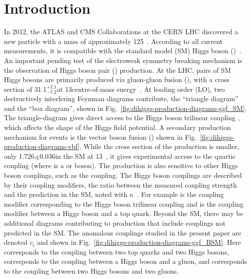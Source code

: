 
\maketitle
\section{Introduction}
In 2012, the ATLAS and CMS Collaborations at the CERN LHC discovered a new particle with a mass of approximately 125\GeV~\cite{Higgs-Discovery_ATLAS, Higgs-Discovery_CMS, Higgs-Discovery_CMS_long}.
According to all current measurements, it is compatible with the standard model (SM) Higgs boson (\PHiggs)~\cite{Nature2022ATLAS, Nature2022, Sirunyan:2018koj, Aad:2019mbh}.
An important pending test of the electroweak symmetry breaking mechanism is the observation of Higgs boson pair (\HH) production.
At the LHC, pairs of SM Higgs bosons are primarily produced via gluon-gluon fusion (\GGF), with a cross section of 31.1$^{+2.1}_{-7.2}$\fb at 13\TeV centre-of-mass energy~\cite{2016_GGFXS,2019_GGFXS,Baglio:2020wgt,DiMicco:2019ngk}.
At leading order (LO), two destructively interfering Feynman diagrams contribute, the ``triangle diagram'' and the ``box diagram'', shown in Fig.~\ref{fig:dihiggs-production-diagrams-ggf_SM}.
The triangle-diagram gives direct access to the Higgs boson trilinear coupling \lambdahhh, which affects the shape of the Higgs field potential.
A secondary production mechanism for \HH events is the vector boson fusion (\VBF) shown in Fig.~\ref{fig:dihiggs-production-diagrams-vbf}.
While the cross section of the \VBF production is smaller, only 1.726$\pm$0.036\fb in the SM at 13\TeV~\cite{2018_VBFXS}, it gives experimental access to the quartic \mbox\PH\PH\PV\PV coupling (where \PV is a \PW or \PZ boson). The \HH production is also sensitive to other Higgs boson couplings, such as the \mbox\PH\PV\PV coupling. The Higgs boson couplings are described by their coupling modifiers, the ratio between the measured coupling strength and the prediction in the SM, noted with \ensuremath{\kappa}~\cite{LHCHiggsCrossSectionWorkingGroup:2013rie}. For example \klambda is the coupling modifier corresponding to the Higgs boson trilinear coupling and \ktop is the coupling modifier between a Higgs boson and a top quark. Beyond the SM, there may be additional diagrams contributing to \HH production that include couplings not predicted in the SM. The anomalous couplings studied in the present paper are denoted $c_i$ and shown in Fig.~\ref{fig:dihiggs-production-diagrams-ggf_BSM}. Here \ctwo corresponds to the coupling between two top quarks and two Higgs bosons, \cg corresponds to the coupling between a Higgs boson and a gluon, and \cgg corresponds to the coupling between two Higgs bosons and two gluons.


